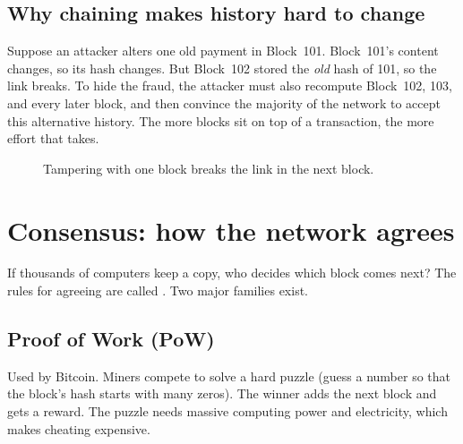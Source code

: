 \subsection{Why chaining makes history hard to change}
Suppose an attacker alters one old payment in Block~101. Block~101's content changes, so its hash changes. But Block~102 stored the \emph{old} hash of 101, so the link breaks. To hide the fraud, the attacker must also recompute Block~102, 103, and every later block, and then convince the majority of the network to accept this alternative history. The more blocks sit on top of a transaction, the more effort that takes.

\begin{figure}[h]
\centering
{}
\caption{Tampering with one block breaks the link in the next block.}
\end{figure}

\section{Consensus: how the network agrees}

If thousands of computers keep a copy, who decides which block comes next? The rules for agreeing are called . Two major families exist.

\subsection{Proof of Work (PoW)}
Used by Bitcoin. Miners compete to solve a hard puzzle (guess a number so that the block's hash starts with many zeros). The winner adds the next block and gets a reward. The puzzle needs massive computing power and electricity, which makes cheating expensive.

